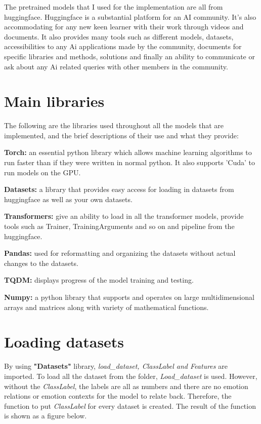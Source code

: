 The pretrained models that I used for the implementation are all from huggingface. Huggingface is a substantial platform for an AI community. It's also accommodating for any new keen learner with their work through videos and documents. It also provides many tools such as different models, datasets, accessibilities to any Ai applications made by the community, documents for specific libraries and methods, solutions and finally an ability to communicate or ask about any Ai related queries with other members in the community.

\section{Main libraries}
The following are the libraries used throughout all the models that are implemented, and the brief descriptions of their use and what they provide:

\textbf{Torch:} an essential python library which allows machine learning algorithms to run faster than if they were written in normal python. It also supports 'Cuda' to run models on the GPU.

\textbf{Datasets:} a library that provides easy access for loading in datasets from huggingface as well as your own datasets.

\textbf{Transformers:} give an ability to load in all the transformer models, provide tools such as Trainer, TrainingArguments and so on and pipeline from the huggingface.

\textbf{Pandas:} used for reformatting and organizing the datasets without actual changes to the datasets.

\textbf{TQDM:} displays progress of the model training and testing.

\textbf{Numpy:} a python library that supports and operates on large multidimensional arrays and matrices along with variety of mathematical functions.

\section{Loading datasets}

By using \textbf{"Datasets"} library, \textit{load\_dataset, ClassLabel and Features} are imported. To load all the dataset from the folder, \emph{Load\_dataset} is used. However, without the \emph{ClassLabel}, the labels are all as numbers and there are no emotion relations or emotion contexts for the model to relate back. Therefore, the function to put \emph{ClassLabel} for every dataset is created. The result of the function is shown as a figure below.
\bigskip

